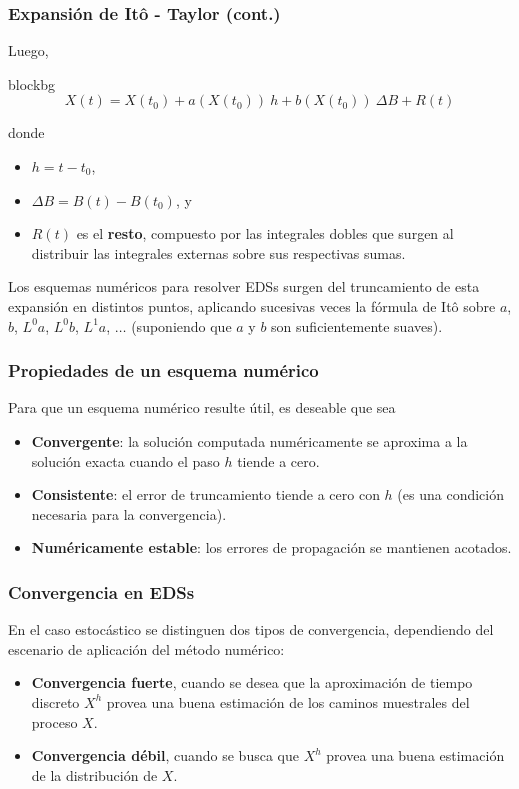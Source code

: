 \documentclass[10pt]{beamer}
\begin{document}
\frame
{
    \frametitle{Expansión de Itô - Taylor (cont.)}

    Luego, \vspace*{0.2cm}

    \begin{beamercolorbox}[wd=1.02\textwidth,ht=0.7cm,rounded=true]{blockbg}
    $$X(t) = X(t_0) + a(X(t_0)) ~h + b(X(t_0)) ~\Delta B + R(t)$$
    \end{beamercolorbox}

    donde
    \begin{itemize}
        \item $h = t - t_0$,
        \item $\Delta B = B(t) - B(t_0)$, y
        \item $R(t)$ es el \textbf{resto}, compuesto por las integrales dobles que surgen al distribuir las integrales
        externas sobre sus respectivas sumas. 
    \end{itemize}

    Los esquemas numéricos para resolver EDSs surgen del truncamiento de esta expansión en distintos
    puntos, aplicando sucesivas veces la fórmula de Itô sobre $a$, $b$, $L^0 a$, $L^0 b$, $L^1 a$, $\dots$ 
    (suponiendo que $a$ y $b$ son suficientemente suaves). 
}

\frame
{
    \frametitle{Propiedades de un esquema numérico}

     Para que un esquema numérico resulte útil, es deseable que sea

    \begin{itemize}
        \item<2-> \textbf{Convergente}: la solución computada numéricamente
        se aproxima a la solución exacta cuando el paso $h$ tiende a cero.

        \item<3-> \textbf{Consistente}: el error de truncamiento tiende a cero
        con $h$ (es una condición necesaria para la convergencia).

        \item<4-> \textbf{Numéricamente estable}: los errores de propagación
        se mantienen acotados.
    \end{itemize}
}

\frame
{
    \frametitle{Convergencia en EDSs}

    En el caso estocástico se distinguen dos tipos de convergencia, 
    dependiendo del escenario de aplicación del método numérico:

    \begin{itemize}
        \item<2-> \textbf{Convergencia fuerte}, cuando se desea que 
        la aproximación de tiempo discreto $X^h$ provea una buena estimación de los caminos
        muestrales del proceso $X$. 

        \item<3-> \textbf{Convergencia débil}, cuando se busca que
        $X^h$ provea una buena estimación de la distribución de $X$.
    \end{itemize}
}
\end{document}
